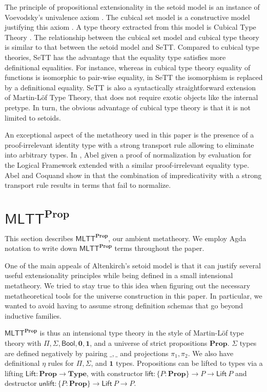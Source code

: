\documentclass{easychair}
\newcommand{\mlttp}{\textsf{MLTT}^{\mProp}}
\newcommand{\mType}{\mathbf{Type}}
\newcommand{\mProp}{\mathbf{Prop}}
\begin{document}
The principle of propositional extensionality in the setoid model is an instance
of Voevodsky's univalence axiom \cite{hottbook}. The cubical set model is a
constructive model justifying this axiom \cite{cubical-sets}. A type theory
extracted from this model is Cubical Type Theory \cite{cubical}. The
relationship between the cubical set model and cubical type theory is similar to
that between the setoid model and SeTT.
%
Compared to cubical type theories, SeTT has the advantage that the equality type
satisfies more definitional equalities. For instance, whereas in cubical type
theory equality of functions is isomorphic to pair-wise equality, in SeTT the
isomorphism is replaced by a definitional equality. SeTT is also a syntactically
straightforward extension of Martin-L\"of Type Theory, that does not require
exotic objects like the internal pretype. In turn, the obvious advantage of
cubical type theory is that it is not limited to setoids.

An exceptional aspect of the metatheory used in this paper is the presence of a
proof-irrelevant identity type with a strong transport rule allowing to
eliminate into arbitrary types.
%
In \cite{abel:nbe09}, Abel given a proof of normalization by evaluation for the
Logical Framework extended with a similar proof-irrelevant equality type.
%
Abel and Coquand show in \cite{abel2019failure} that the combination of
impredicativity with a strong transport rule results in terms that fail to
normalize.

\section{$\mlttp$}\label{metatheory}

This section describes $\mlttp$, our ambient metatheory. We employ Agda notation
to write down $\mlttp$ terms throughout the paper.

One of the main appeals of Altenkirch's setoid model is that it can justify
several useful extensionality principles while being defined in a small
intensional metatheory.
%
We tried to stay true to this idea when figuring out the necessary
metatheoretical tools for the universe construction in this paper. In
particular, we wanted to avoid having to assume strong definition schemas that
go beyond inductive families.

$\mlttp$ is thus an intensional type theory in the style of Martin-L\"of type
theory with $\Pi, \Sigma, \textsf{Bool}, \mathbf{0}, \mathbf{1}$, and a universe
of strict propositions $\mProp$. $\Sigma$ types are defined negatively by
pairing $\_,\_$ and projections $\pi_1, \pi_2$. We also have definitional $\eta$
rules for $\Pi, \Sigma$, and $\mathbf{1}$ types. Propositions can be lifted to
types via a lifting $\textsf{Lift} : \mProp \to \mType$, with constructor
$\textsf{lift} : \{P : \mProp \} \to P \to \textsf{Lift}\ P$ and destructor
$\textsf{unlift} : \{P : \mProp \} \to \textsf{Lift}\ P \to P$.
\end{document}
